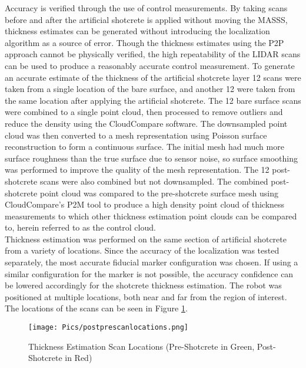 Accuracy is verified through the use of control measurements. By taking scans before and after the artificial shotcrete is applied without moving the MASSS, thickness estimates can be generated without introducing the localization algorithm as a source of error. Though the thickness estimates using the P2P approach cannot be physically verified, the high repeatability of the LIDAR scans can be used to produce a reasonably accurate control measurement. To generate an accurate estimate of the thickness of the artificial shotcrete layer 12 scans were taken from a single location of the bare surface, and another 12 were taken from the same location after applying the artificial shotcrete. The 12 bare surface scans were combined to a single point cloud, then processed to remove outliers and reduce the density using the CloudCompare software. The downsampled point cloud was then converted to a mesh representation using Poisson surface reconstruction to form a continuous surface. The initial mesh had much more surface roughness than the true surface due to sensor noise, so surface smoothing was performed to improve the quality of the mesh representation. The 12 post-shotcrete scans were also combined but not downsampled. The combined post-shotcrete point cloud was compared to the pre-shotcrete surface mesh using CloudCompare's P2M tool to produce a high density point cloud of thickness measurements to which other thickness estimation point clouds can be compared to, herein referred to as the control cloud.\\

Thickness estimation was performed on the same section of artificial shotcrete from a variety of locations. Since the accuracy of the localization was tested separately, the most accurate fiducial marker configuration was chosen. If using a similar configuration for the marker is not possible, the accuracy confidence can be lowered accordingly for the shotcrete thickness estimation. The robot was positioned at multiple locations, both near and far from the region of interest. The locations of the scans can be seen in Figure \ref{fig:thickscans}.\\

\begin{figure}
    \centering
    \texttt{[image: Pics/postprescanlocations.png]}
    \caption{Thickness Estimation Scan Locations (Pre-Shotcrete in Green, Post-Shotcrete in Red)}
    \label{fig:thickscans}
\end{figure}

